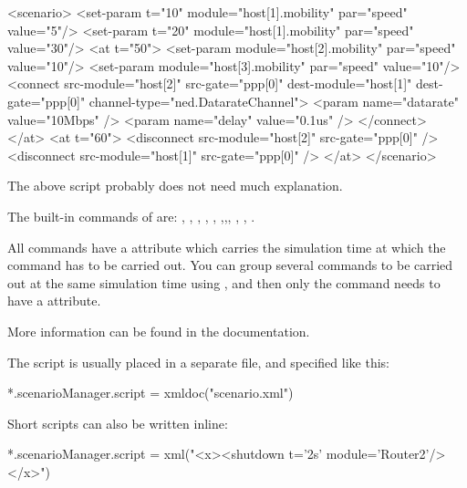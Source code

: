 \begin{XML}
<scenario>
    <set-param t="10" module="host[1].mobility" par="speed" value="5"/>
    <set-param t="20" module="host[1].mobility" par="speed" value="30"/>
    <at t="50">
        <set-param module="host[2].mobility" par="speed" value="10"/>
        <set-param module="host[3].mobility" par="speed" value="10"/>
        <connect src-module="host[2]" src-gate="ppp[0]"
                 dest-module="host[1]" dest-gate="ppp[0]"
                 channel-type="ned.DatarateChannel">
            <param name="datarate" value="10Mbps" />
            <param name="delay" value="0.1us" />
        </connect>
    </at>
    <at t="60">
        <disconnect src-module="host[2]" src-gate="ppp[0]" />
        <disconnect src-module="host[1]" src-gate="ppp[0]" />
    </at>
</scenario>
\end{XML}

The above script probably does not need much explanation.

The built-in commands of  are: 
, ,
, ,   
, ,,, 
, , .

All commands have a  attribute which carries the simulation time
at which the command has to be carried out. You can group several commands
to be carried out at the same simulation time using , and
then only the  command needs to have a  attribute.

More information can be found in the  documentation.

The script is usually placed in a separate file, and specified like this: 

\begin{inifile}
*.scenarioManager.script = xmldoc("scenario.xml")
\end{inifile}

Short scripts can also be written inline:

\begin{inifile}
*.scenarioManager.script = xml("<x><shutdown t='2s' module='Router2'/></x>")
\end{inifile}


 
